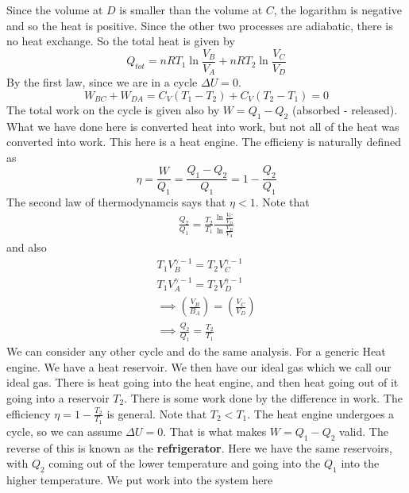 \documentclass{report}
\numberwithin{equation}{section}
\begin{document}
Since the volume at $D$ is smaller than the volume at $C$, the logarithm is negative and so the heat is positive. Since the other two processes are adiabatic, there is no heat exchange. So the total heat is given by 
\begin{equation}
    Q_{tot} = nRT_1\ln\frac{V_B}{V_A} + nRT_2\ln\frac{V_C}{V_D}
\end{equation}
By the first law, since we are in a cycle $\Delta U = 0$. 
\begin{equation*}
    W_{BC} + W_{DA} = C_V(T_1-T_2) + C_V(T_2-T_1) = 0
\end{equation*}
The total work on the cycle is given also by $W = Q_1-Q_2$ (absorbed - released). What we have done here is converted heat into work, but not all of the heat was converted into work. This here is a heat engine. 
The efficieny is naturally defined as 
\begin{equation}
    \eta = \frac{W}{Q_1} = \frac{Q_1 - Q_2}{Q_1} = 1 -\frac{Q_2}{Q_1}
\end{equation}
The second law of thermodynamcis says that $\eta <1$. Note that 
\begin{align*}
    \frac{Q_2}{Q_1} = \frac{T_2}{T_1}\frac{\ln\frac{V_C}{V_D}}{\ln \frac{V_B}{V_A}}
\end{align*}
and also 
\begin{align*}
    T_1V_B^{\gamma -1} = T_2V_C^{\gamma -1}\\
    T_1V_A^{\gamma -1} = T_2V_D^{\gamma - 1}\\
    \implies \left(\frac{V_B}{B_A}\right) = \left(\frac{V_C}{V_D}\right)\\
    \implies \frac{Q_2}{Q_1} = \frac{T_2}{T_1}
\end{align*}
We can consider any other cycle and do the same analysis. For a generic Heat engine. We have a heat reservoir. We then have our ideal gas which we call our ideal gas. There is heat going into the heat engine, and then heat going out of it going into a reservoir $T_2$. There is some work done by the difference in work. 
The efficiency $\eta = 1 - \frac{T_2}{T_1}$ is general. Note that $T_2<T_1$. The heat engine undergoes a cycle, so we can assume $\Delta U = 0$. That is what makes $W = Q_1 - Q_2$ valid. The reverse of this is known as the \textbf{refrigerator}. Here we have the same reservoirs, with $Q_2$ coming out of the lower temperature and going into the $Q_1$ into the higher temperature. We put work into the system here
\end{document}
